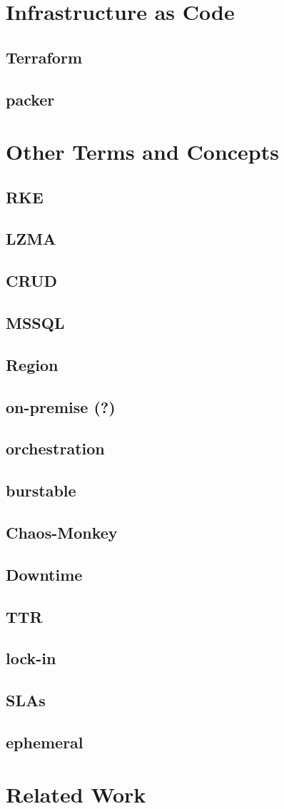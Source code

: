 \chapter{Infrastructure as Code}
\section{Terraform}
\section{packer}


\chapter{Other Terms and Concepts}
\section*{RKE}
\section*{LZMA}
\section*{CRUD}
\section*{MSSQL}
\section*{Region}
\section*{on-premise (?)}
\section*{orchestration}
\section*{burstable}
\section*{Chaos-Monkey}
\section*{Downtime}
\section*{TTR}
\section*{lock-in}
\section*{SLAs}
\section*{ephemeral}

\chapter{Related Work}
